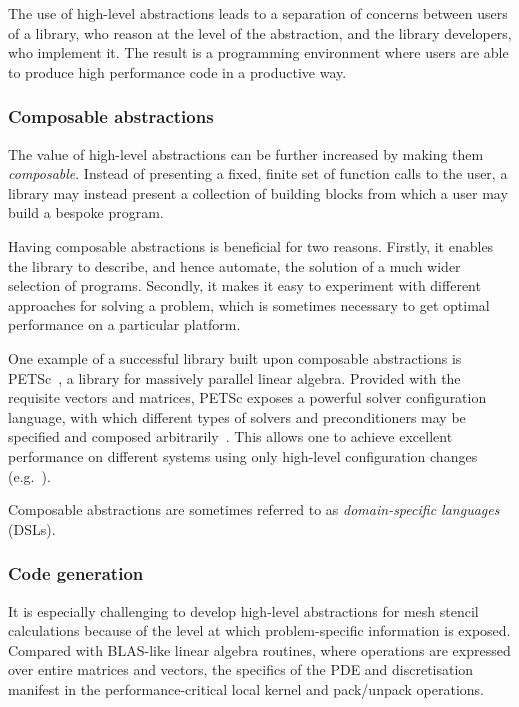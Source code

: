 \documentclass[thesis]{subfiles}
\begin{document}
The use of high-level abstractions leads to a separation of concerns between users of a library, who reason at the level of the abstraction, and the library developers, who implement it. 
The result is a programming environment where users are able to produce high performance code in a productive way.

\subsubsection{Composable abstractions}

The value of high-level abstractions can be further increased by making them \emph{composable}.
Instead of presenting a fixed, finite set of function calls to the user, a library may instead present a collection of building blocks from which a user may build a bespoke program.

Having composable abstractions is beneficial for two reasons.
Firstly, it enables the library to describe, and hence automate, the solution of a much wider selection of programs.
Secondly, it makes it easy to experiment with different approaches for solving a problem, which is sometimes necessary to get optimal performance on a particular platform.

One example of a successful library built upon composable abstractions is PETSc~\cite{petsc-user-ref,petsc-web-page,petsc-efficient}, a library for massively parallel linear algebra.
Provided with the requisite vectors and matrices, PETSc exposes a powerful solver configuration language, with which different types of solvers and preconditioners may be specified and composed arbitrarily~\cite{brownComposableLinearSolvers2012,smith2012petsc}.
This allows one to achieve excellent performance on different systems using only high-level configuration changes (e.g.~\cite{betteridgeCodeGenerationProductive2021}).

Composable abstractions are sometimes referred to as \emph{domain-specific languages} (DSLs).

\subsubsection{Code generation}
\label{sec:intro_software_codegen}

It is especially challenging to develop high-level abstractions for mesh stencil calculations because of the level at which problem-specific information is exposed.
Compared with BLAS-like linear algebra routines, where operations are expressed over entire matrices and vectors, the specifics of the PDE and discretisation manifest in the performance-critical local kernel and pack/unpack operations.
\end{document}
